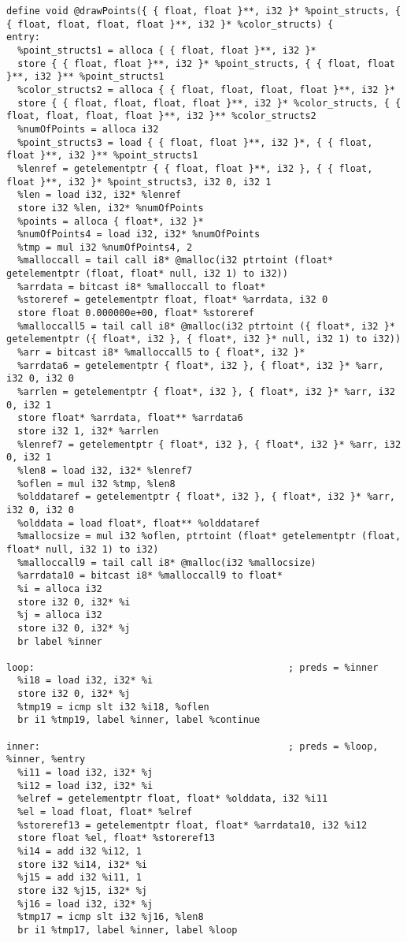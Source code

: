 \documentclass[main.tex]{subfiles}
\begin{document}
{\begin{lstlisting}
define void @drawPoints({ { float, float }**, i32 }* %point_structs, { { float, float, float, float }**, i32 }* %color_structs) {
entry:
  %point_structs1 = alloca { { float, float }**, i32 }*
  store { { float, float }**, i32 }* %point_structs, { { float, float }**, i32 }** %point_structs1
  %color_structs2 = alloca { { float, float, float, float }**, i32 }*
  store { { float, float, float, float }**, i32 }* %color_structs, { { float, float, float, float }**, i32 }** %color_structs2
  %numOfPoints = alloca i32
  %point_structs3 = load { { float, float }**, i32 }*, { { float, float }**, i32 }** %point_structs1
  %lenref = getelementptr { { float, float }**, i32 }, { { float, float }**, i32 }* %point_structs3, i32 0, i32 1
  %len = load i32, i32* %lenref
  store i32 %len, i32* %numOfPoints
  %points = alloca { float*, i32 }*
  %numOfPoints4 = load i32, i32* %numOfPoints
  %tmp = mul i32 %numOfPoints4, 2
  %malloccall = tail call i8* @malloc(i32 ptrtoint (float* getelementptr (float, float* null, i32 1) to i32))
  %arrdata = bitcast i8* %malloccall to float*
  %storeref = getelementptr float, float* %arrdata, i32 0
  store float 0.000000e+00, float* %storeref
  %malloccall5 = tail call i8* @malloc(i32 ptrtoint ({ float*, i32 }* getelementptr ({ float*, i32 }, { float*, i32 }* null, i32 1) to i32))
  %arr = bitcast i8* %malloccall5 to { float*, i32 }*
  %arrdata6 = getelementptr { float*, i32 }, { float*, i32 }* %arr, i32 0, i32 0
  %arrlen = getelementptr { float*, i32 }, { float*, i32 }* %arr, i32 0, i32 1
  store float* %arrdata, float** %arrdata6
  store i32 1, i32* %arrlen
  %lenref7 = getelementptr { float*, i32 }, { float*, i32 }* %arr, i32 0, i32 1
  %len8 = load i32, i32* %lenref7
  %oflen = mul i32 %tmp, %len8
  %olddataref = getelementptr { float*, i32 }, { float*, i32 }* %arr, i32 0, i32 0
  %olddata = load float*, float** %olddataref
  %mallocsize = mul i32 %oflen, ptrtoint (float* getelementptr (float, float* null, i32 1) to i32)
  %malloccall9 = tail call i8* @malloc(i32 %mallocsize)
  %arrdata10 = bitcast i8* %malloccall9 to float*
  %i = alloca i32
  store i32 0, i32* %i
  %j = alloca i32
  store i32 0, i32* %j
  br label %inner

loop:                                             ; preds = %inner
  %i18 = load i32, i32* %i
  store i32 0, i32* %j
  %tmp19 = icmp slt i32 %i18, %oflen
  br i1 %tmp19, label %inner, label %continue

inner:                                            ; preds = %loop, %inner, %entry
  %i11 = load i32, i32* %j
  %i12 = load i32, i32* %i
  %elref = getelementptr float, float* %olddata, i32 %i11
  %el = load float, float* %elref
  %storeref13 = getelementptr float, float* %arrdata10, i32 %i12
  store float %el, float* %storeref13
  %i14 = add i32 %i12, 1
  store i32 %i14, i32* %i
  %j15 = add i32 %i11, 1
  store i32 %j15, i32* %j
  %j16 = load i32, i32* %j
  %tmp17 = icmp slt i32 %j16, %len8
  br i1 %tmp17, label %inner, label %loop


\end{lstlisting}}
\end{document}
